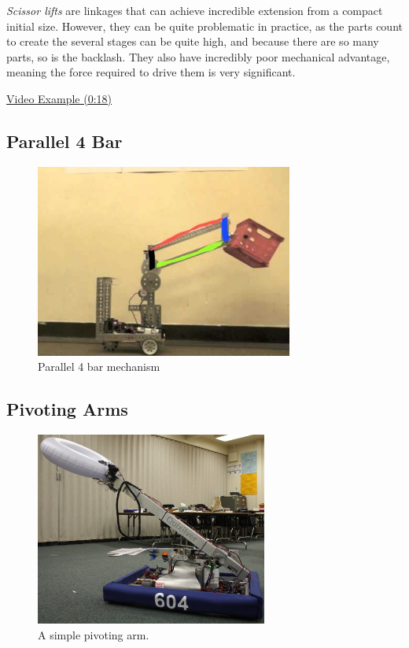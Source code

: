 \textit{Scissor lifts} are linkages that can achieve incredible extension from a compact initial size. However, they can be quite problematic in practice, as the parts count to create the several stages can be quite high, and because there are so many parts, so is the backlash. They also have incredibly poor mechanical advantage, meaning the force required to drive them is very significant.

\href{https://youtu.be/J_VfCjKBGNw?t=18}{\color{red}\underline{Video Example (0:18)}}
\subsection{Parallel 4 Bar}
\begin{figure}[H]
	\includegraphics[height=2.5in]{imgs/parallel_4bar.jpeg}
	\caption{Parallel 4 bar mechanism}
\end{figure}

\subsection{Pivoting Arms}

\begin{figure}[H]
	\includegraphics[height=2.5in]{imgs/simple_arm.jpeg}
	\caption{A simple pivoting arm.}
\end{figure}

